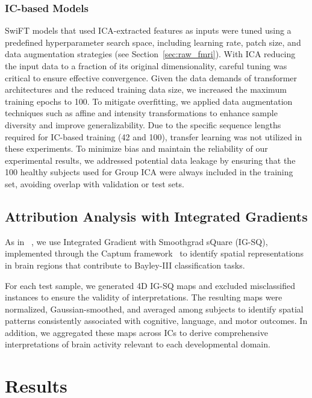 \documentclass[runningheads,a4paper]{llncs}
\begin{document}
\subsubsection{IC-based Models}
SwiFT models that used ICA-extracted features as inputs were tuned using a predefined hyperparameter search space, including learning rate, patch size, and data augmentation strategies (see Section~\ref{sec:raw_fmri}). With ICA reducing the input data to a fraction of its original dimensionality, careful tuning was critical to ensure effective convergence. Given the data demands of transformer architectures and the reduced training data size, we increased the maximum training epochs to 100. To mitigate overfitting, we applied data augmentation techniques such as affine and intensity transformations to enhance sample diversity and improve generalizability. Due to the specific sequence lengths required for IC-based training (42 and 100), transfer learning was not utilized in these experiments.
%
To minimize bias and maintain the reliability of our experimental results, we addressed potential data leakage by ensuring that the 100 healthy subjects used for Group ICA were always included in the training set, avoiding overlap with validation or test sets.

\subsection{Attribution Analysis with Integrated Gradients}
As in ~\cite{kim2023swiftswin4dfmri}, we use Integrated Gradient with Smoothgrad sQuare (IG-SQ), implemented through the Captum framework~\cite{captum1} to identify spatial representations in brain regions that contribute to Bayley-III classification tasks.
%

For each test sample, we generated 4D IG-SQ maps and excluded misclassified instances to ensure the validity of interpretations. The resulting maps were normalized, Gaussian-smoothed, and averaged among subjects to identify spatial patterns consistently associated with cognitive, language, and motor outcomes. In addition, we aggregated these maps across ICs to derive comprehensive interpretations of brain activity relevant to each developmental domain.

\section{Results}
\end{document}
